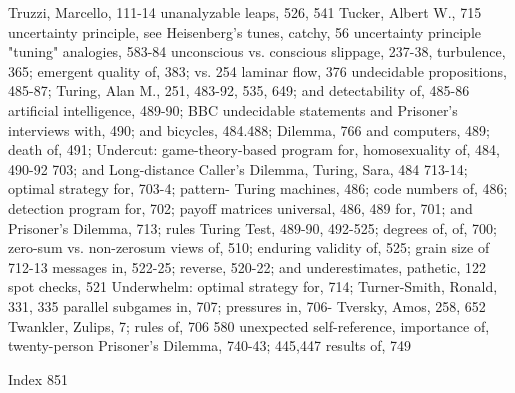 Truzzi, Marcello, 111-14                            unanalyzable leaps, 526, 541
Tucker, Albert W., 715                              uncertainty principle, see Heisenberg's
tunes, catchy, 56                                    uncertainty principle
"tuning" analogies, 583-84                          unconscious vs. conscious slippage, 237-38,
turbulence, 365; emergent quality of, 383; vs.       254
  laminar flow, 376                                 undecidable propositions, 485-87;
Turing, Alan M., 251, 483-92, 535, 649; and          detectability of, 485-86
  artificial intelligence, 489-90; BBC              undecidable statements and Prisoner's
  interviews with, 490; and bicycles, 484.488;       Dilemma, 766
  and computers, 489; death of, 491;                Undercut: game-theory-based program for,
  homosexuality of, 484, 490-92                      703; and Long-distance Caller's Dilemma,
Turing, Sara, 484                                    713-14; optimal strategy for, 703-4; pattern-
Turing machines, 486; code numbers of, 486;          detection program for, 702; payoff matrices
  universal, 486, 489                                for, 701; and Prisoner's Dilemma, 713; rules
Turing Test, 489-90, 492-525; degrees of,            of, 700; zero-sum vs. non-zerosum views of,
  510; enduring validity of, 525; grain size of      712-13
  messages in, 522-25; reverse, 520-22; and         underestimates, pathetic, 122
  spot checks, 521                                  Underwhelm: optimal strategy for, 714;
Turner-Smith, Ronald, 331, 335                       parallel subgames in, 707; pressures in, 706-
Tversky, Amos, 258, 652 Twankler, Zulips,            7; rules of, 706
  580                                               unexpected self-reference, importance of,
twenty-person Prisoner's Dilemma, 740-43;            445,447
  results of, 749

 Index                                                                                        851

